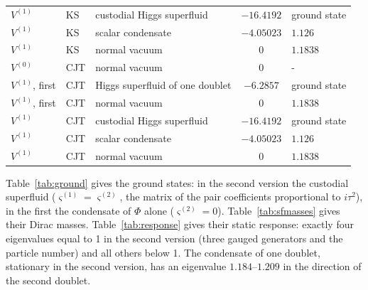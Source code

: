 \documentclass[aps,prd,onecolumn,superscriptaddress,nofootinbib,floatfix,longbibliography]{revtex4-2}
\begin{document}
\begin{table}[!htbp]
\begin{tabular}{lllcl}
$V^{(1)}$ & KS & custodial Higgs superfluid & $-16.4192$ & ground state \\
$V^{(1)}$ & KS & scalar condensate & $-4.05023$ & $1.126$ \\
$V^{(1)}$ & KS & normal vacuum & $0$ & $1.1838$ \\
$V^{(0)}$ & CJT & normal vacuum & $0$ & - \\
$V^{(1)}$, first & CJT & Higgs superfluid of one doublet & $-6.2857$ & ground state \\
$V^{(1)}$, first & CJT & normal vacuum & $0$ & $1.1838$ \\
$V^{(1)}$ & CJT & custodial Higgs superfluid & $-16.4192$ & ground state \\
$V^{(1)}$ & CJT & scalar condensate & $-4.05023$ & $1.126$ \\
$V^{(1)}$ & CJT & normal vacuum & $0$ & $1.1838$ \\
\hline\hline
\end{tabular}\par
\endgroup
\end{table}

Table~\ref{tab:ground} gives the ground states: in the second version the custodial superfluid
($\varsigma^{(1)}=\varsigma^{(2)}$, the matrix of the pair coefficients proportional to $i\tau^2$), in the first the
condensate of $\Phi$ alone ($\varsigma^{(2)}=0$). Table~\ref{tab:sfmasses} gives their Dirac masses. Table~\ref{tab:response}
gives their static response: exactly four eigenvalues equal to 1 in the second version (three gauged generators and the
particle number) and all others below 1. The condensate of one doublet, stationary in the second version, has an
eigenvalue \ensuremath{1.184}\mbox{--}\ensuremath{1.209} in the direction of the second doublet.
\end{document}
